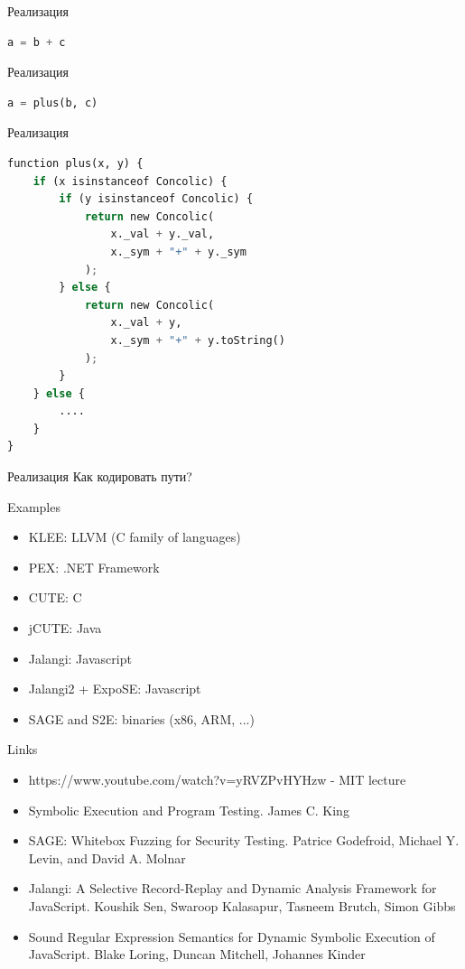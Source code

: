 \documentclass{beamer}
\begin{document}
\begin{frame}[fragile]{Реализация}
\begin{lstlisting}[language=python,escapechar=@]
a = b + c
\end{lstlisting}
\end{frame}

\begin{frame}[fragile]{Реализация}
\begin{lstlisting}[language=python,escapechar=@]
a = plus(b, c)
\end{lstlisting}
\end{frame}

\begin{frame}[fragile]{Реализация}
\begin{lstlisting}[language=python,escapechar=@]
function plus(x, y) {
    if (x isinstanceof Concolic) {
        if (y isinstanceof Concolic) {
            return new Concolic(
                x._val + y._val,
                x._sym + "+" + y._sym
            );
        } else {
            return new Concolic(
                x._val + y,
                x._sym + "+" + y.toString()
            );
        }
    } else {
        ....
    }
}
\end{lstlisting}
\end{frame}

\begin{frame}[fragile]{Реализация}
Как кодировать пути?
\end{frame}

\begin{frame}{Examples}
\begin{itemize}
\item KLEE: LLVM (C family of languages)
\item PEX: .NET Framework
\item CUTE: C
\item jCUTE: Java
\item Jalangi: Javascript
\item Jalangi2 + ExpoSE: Javascript
\item SAGE and S2E: binaries (x86, ARM, ...)
\end{itemize}
\end{frame}

\begin{frame}{Links}
\begin{itemize}
\item https://www.youtube.com/watch?v=yRVZPvHYHzw - MIT lecture
\item Symbolic Execution and Program Testing. James C. King
\item SAGE: Whitebox Fuzzing for Security Testing. Patrice Godefroid, Michael Y. Levin, and David A. Molnar
\item Jalangi: A Selective Record-Replay and Dynamic Analysis Framework for JavaScript. Koushik Sen, Swaroop Kalasapur, Tasneem Brutch, Simon Gibbs
\item Sound Regular Expression Semantics for Dynamic Symbolic Execution of JavaScript. Blake Loring, Duncan Mitchell, Johannes Kinder
\end{itemize}
\end{frame}
\end{document}
